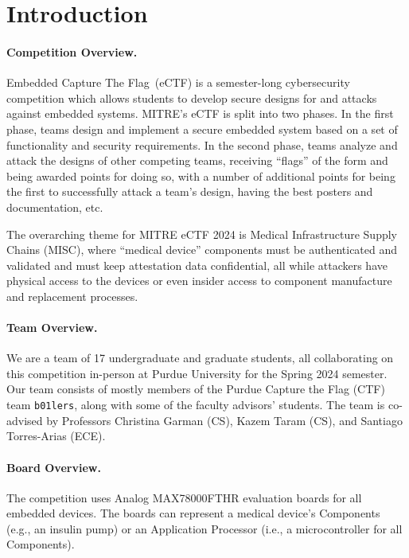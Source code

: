 \section{Introduction}
\label{sec:intro}


\paragraph{Competition Overview.}
Embedded Capture The Flag\texttrademark~(eCTF) is a semester-long cybersecurity competition which allows students to develop secure designs for and attacks against embedded systems. MITRE's eCTF is split into two phases. In the first phase, teams design and implement a secure embedded system based on a set of functionality and security requirements. In the second phase, teams analyze and attack the designs of other competing teams, receiving ``flags'' of the form \flag{\dots} and being awarded points for doing so, with a number of additional points for being the first to successfully attack a team's design, having the best posters and documentation, etc.

The overarching theme for MITRE eCTF 2024 \cite{eCTFOfficial} is Medical Infrastructure Supply Chains (MISC), where ``medical device'' components must be authenticated and validated and must keep attestation data confidential, all while attackers have physical access to the devices or even insider access to component manufacture and replacement processes.

\paragraph{Team Overview.} We are a team of 17 undergraduate and graduate students, all collaborating on this competition in-person at Purdue University for the Spring 2024 semester. Our team consists of mostly members of the Purdue Capture the Flag (CTF) team \texttt{b01lers}, along with some of the faculty advisors' students. The team is co-advised by Professors Christina Garman (CS), Kazem Taram (CS), and Santiago Torres-Arias (ECE).

\paragraph{Board Overview.} The competition uses Analog MAX78000FTHR evaluation boards for all embedded devices. The boards can represent a medical device's Components (e.g., an insulin pump) or an Application Processor (i.e., a microcontroller for all Components).